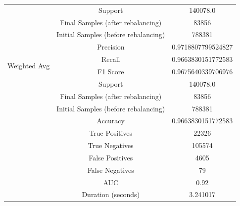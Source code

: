 \begin{longtable}{|c|c|c|}
 & Support & 140078.0 \\
 & Final Samples (after rebalancing) & 83856 \\
 & Initial Samples (before rebalancing) & 788381 \\
\hline
\multirow{4}{*}{Weighted Avg} & Precision & 0.9718807799524827 \\
 & Recall & 0.9663830151772583 \\
 & F1 Score & 0.9675640339706976 \\
 & Support & 140078.0 \\
 & Final Samples (after rebalancing) & 83856 \\
 & Initial Samples (before rebalancing) & 788381 \\
\hline
& Accuracy & 0.9663830151772583 \\ \hline
& True Positives & 22326 \\ \hline
& True Negatives & 105574 \\ \hline
& False Positives & 4605 \\ \hline
& False Negatives & 79 \\ \hline
& AUC & 0.92 \\ \hline
& Duration (seconds) & 3.241017 \\ \hline
\end{longtable}


